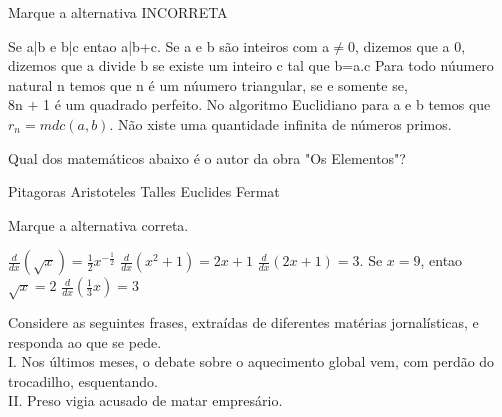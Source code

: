\documentclass[12pt]{exam}
\begin{document}
\begin{questions}
\begin{parts}
\end{parts}
\question[1] Marque a alternativa INCORRETA
\begin{choices}
\choice Se a|b e b|c entao a|b+c.
\choice Se a e b são inteiros com a$\neq$0, dizemos que a 0, dizemos que a divide b se existe um inteiro c tal que b=a.c 
\choice Para todo núumero natural n temos que n é um núumero triangular, se e somente se,\\ 8n $+$ 1 é um quadrado perfeito.
\choice No algoritmo Euclidiano para a e b temos que $r_n= mdc(a, b) .$
\choice Não xiste uma quantidade infinita de números primos.
\end{choices}
\question[1] Qual dos  matemáticos abaixo é o autor da obra "Os Elementos"?\\
		
\begin{oneparchoices}
\choice Pitagoras
\choice Aristoteles
\choice Talles
\choice Euclides
\choice Fermat
\end{oneparchoices}
\question[1] Marque a alternativa correta.
\addpoints
\begin{checkboxes}
\choice $\frac{d}{dx} (\sqrt{x})=\frac{1}{2}x^{-\frac{1}{2}}$
\choice $\frac{d}{dx} (x^2+1) = 2x+1$
\choice $\frac{d}{dx} (2x+1) = 3$.
\choice Se $x=9$, entao $\sqrt{x}=2$
\choice $\frac{d}{dx} (\frac{1}{3}x)=3$
\end{checkboxes}
\question[1]\citep{Fuvest(2009)} Considere as seguintes frases, extraídas de diferentes matérias jornalísticas, e responda ao que se pede.\\
		
I. Nos últimos meses, o debate sobre o aquecimento global vem, com perdão do trocadilho, esquentando.\\
II. Preso vigia acusado de matar empresário.\\
		

\end{questions}
\end{document}

